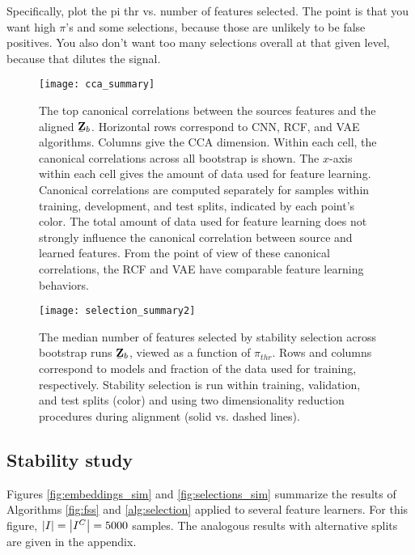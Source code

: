 Specifically, plot the pi thr vs. number of features
selected. The point is that you want high $\pi$'s and some selections, because
those are unlikely to be false positives. You also don't want too many
selections overall at that given level, because that dilutes the signal.


\begin{figure}
  \centering
  \texttt{[image: cca\_summary]}
  \caption{The top canonical correlations between the sources features and the
    aligned $\protect\underaccent{\bar}{\mathbf{Z}}_{b}$. Horizontal rows correspond to
    CNN, RCF, and VAE algorithms. Columns give the CCA dimension. Within each
    cell, the canonical correlations across all bootstrap is shown. The $x$-axis
    within each cell gives the amount of data used for feature learning.
    Canonical correlations are computed separately for samples within training,
    development, and test splits, indicated by each point's color. The total
    amount of data used for feature learning does not strongly influence the
    canonical correlation between source and learned features. From the point of
    view of these canonical correlations, the RCF and VAE have comparable
    feature learning behaviors.}
  \label{fig:cca_summary}
\end{figure}

\begin{figure}
  \centering
  \texttt{[image: selection\_summary2]}
  \caption{The median number of features selected by stability selection across
    bootstrap runs $\protect\underaccent{\bar}{\mathbf{Z}}_{b}$, viewed as a function of
    $\pi_{thr}$. Rows and columns correspond to models and fraction of the data
    used for training, respectively. Stability selection is run within training,
    validation, and test splits (color) and using two dimensionality reduction
    procedures during alignment (solid vs. dashed lines).}
  \label{fig:selection_summary}
\end{figure}


\subsection{Stability study}

Figures \ref{fig:embeddings_sim} and \ref{fig:selections_sim} summarize the
results of Algorithms \ref{fig:fss} and \ref{alg:selection} applied to several
feature learners. For this figure, $\left|I\right| = \left|I^{C}\right| = 5000$ samples.
The analogous results with alternative splits are given in the appendix.

